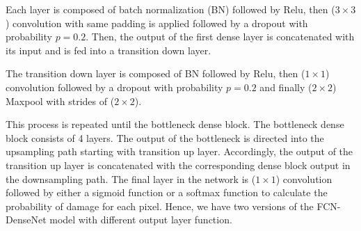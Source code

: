 Each layer is composed of batch normalization (BN) followed by Relu, then (\(3\times3\)) convolution with same padding is applied followed by a dropout with probability \(p = 0.2\).
Then, the output of the first dense layer is concatenated with its input and is fed into a transition down layer. 

The transition down layer is composed of BN followed by Relu, then (\(1\times1\)) convolution followed by a dropout with probability \(p = 0.2\) and finally (\(2\times2\)) Maxpool with strides of (\(2\times2\)).

This process is repeated until the bottleneck dense block.
The bottleneck dense block consists of 4 layers.
The output of the bottleneck is directed into the upsampling path starting with transition up layer.
Accordingly, the output of the transition up layer is concatenated with the corresponding dense block output in the downsampling path.
The final layer in the network is  (\(1\times1\)) convolution followed by either a sigmoid function or a softmax function to calculate the probability of damage for each pixel.
Hence, we have two versions of the FCN-DenseNet model with different output layer function.


